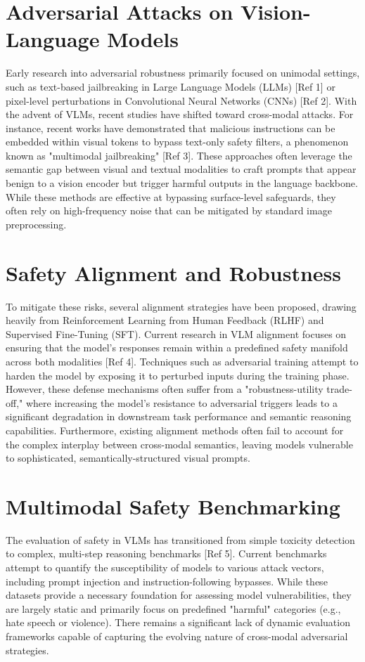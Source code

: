 \documentclass[11pt,a4paper]{article}
\begin{document}
\section{Adversarial Attacks on Vision-Language Models}
Early research into adversarial robustness primarily focused on unimodal settings, such as text-based jailbreaking in Large Language Models (LLMs) [Ref 1] or pixel-level perturbations in Convolutional Neural Networks (CNNs) [Ref 2]. With the advent of VLMs, recent studies have shifted toward cross-modal attacks. For instance, recent works have demonstrated that malicious instructions can be embedded within visual tokens to bypass text-only safety filters, a phenomenon known as "multimodal jailbreaking" [Ref 3]. These approaches often leverage the semantic gap between visual and textual modalities to craft prompts that appear benign to a vision encoder but trigger harmful outputs in the language backbone. While these methods are effective at bypassing surface-level safeguards, they often rely on high-frequency noise that can be mitigated by standard image preprocessing.

\section{Safety Alignment and Robustness}
To mitigate these risks, several alignment strategies have been proposed, drawing heavily from Reinforcement Learning from Human Feedback (RLHF) and Supervised Fine-Tuning (SFT). Current research in VLM alignment focuses on ensuring that the model’s responses remain within a predefined safety manifold across both modalities [Ref 4]. Techniques such as adversarial training attempt to harden the model by exposing it to perturbed inputs during the training phase. However, these defense mechanisms often suffer from a "robustness-utility trade-off," where increasing the model's resistance to adversarial triggers leads to a significant degradation in downstream task performance and semantic reasoning capabilities. Furthermore, existing alignment methods often fail to account for the complex interplay between cross-modal semantics, leaving models vulnerable to sophisticated, semantically-structured visual prompts.

\section{Multimodal Safety Benchmarking}
The evaluation of safety in VLMs has transitioned from simple toxicity detection to complex, multi-step reasoning benchmarks [Ref 5]. Current benchmarks attempt to quantify the susceptibility of models to various attack vectors, including prompt injection and instruction-following bypasses. While these datasets provide a necessary foundation for assessing model vulnerabilities, they are largely static and primarily focus on predefined "harmful" categories (e.g., hate speech or violence). There remains a significant lack of dynamic evaluation frameworks capable of capturing the evolving nature of cross-modal adversarial strategies.
\end{document}
